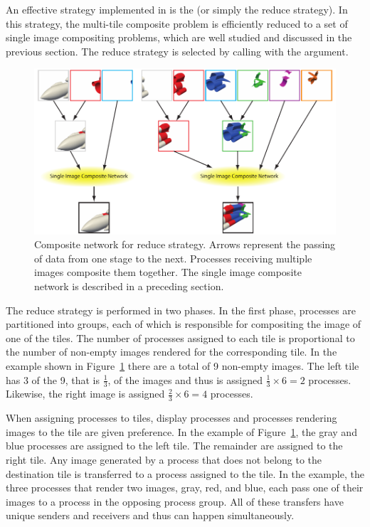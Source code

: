 
An effective strategy implemented in \IceT is the  (or simply the reduce strategy).  In this strategy, the
multi-tile composite problem is efficiently reduced to a set of single
image compositing problems, which are well studied and discussed in the
previous section.  The reduce strategy is selected by calling
 with the  argument.

\begin{figure}
  \centering
  \includegraphics{images/ReduceComposite}
  \caption[Reduce strategy composite network.]{Composite network for reduce
    strategy.  Arrows represent the passing of data from one stage to the
    next.  Processes receiving multiple images composite them together.
    The single image composite network is described in a preceding
    section.}
  \label{fig:ReduceComposite}
\end{figure}

The reduce strategy is performed in two phases.  In the first phase,
processes are partitioned into groups, each of which is responsible for
compositing the image of one of the tiles.  The number of processes
assigned to each tile is proportional to the number of non-empty images
rendered for the corresponding tile.  In the example shown in
Figure~\ref{fig:ReduceComposite} there are a total of 9 non-empty images.
The left tile has 3 of the 9, that is $\frac{1}{3}$, of the images and thus
is assigned $\frac{1}{3} \times 6 = 2$ processes.  Likewise, the right
image is assigned $\frac{2}{3} \times 6 = 4$ processes.

When assigning processes to tiles, display processes and processes rendering
images to the tile are given preference.  In the example of
Figure~\ref{fig:ReduceComposite}, the gray and blue processes are assigned
to the left tile.  The remainder are assigned to the right tile.  Any image
generated by a process that does not belong to the destination tile is
transferred to a process assigned to the tile.  In the example, the three
processes that render two images, gray, red, and blue, each pass one of
their images to a process in the opposing process group.  All of these
transfers have unique senders and receivers and thus can happen
simultaneously.

